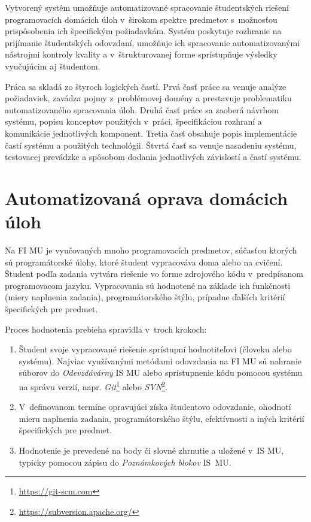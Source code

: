 \documentclass[
  digital, %
  oneside, %
  table,   %
  lof,     %
  lot,   %
]{fithesis3}
\begin{document}
Vytvorený systém umožňuje automatizované spracovanie študentských riešení programovacích domácich úloh v~širokom spektre predmetov s~možnosťou prispôsobenia ich špecifickým požiadavkám. Systém poskytuje rozhranie na prijímanie študentských odovzdaní, umožňuje ich spracovanie automatizovanými nástrojmi kontroly kvality a v~štrukturovanej forme sprístupňuje výsledky vyučujúcim aj študentom.

Práca sa skladá zo štyroch logických častí. Prvá časť práce sa venuje analýze požiadaviek, zavádza pojmy z~problémovej domény a prestavuje problematiku automatizovaného spracovania úloh. Druhá časť práce sa zaoberá návrhom systému, popisu konceptov použitých v~práci, špecifikáciou rozhraní a komunikácie jednotlivých komponent. Tretia časť obsahuje popis implementácie častí systému a použitých technológii. Štvrtá časť sa venuje nasadeniu systému, testovacej prevádzke a spôsobom dodania jednotlivých závislostí a častí systému. 


\chapter{Automatizovaná oprava domácich úloh}

Na FI MU je vyučovaných mnoho programovacích predmetov, súčasťou ktorých sú programátorské úlohy, ktoré študent vypracováva doma alebo na cvičení. Študent podľa zadania vytvára riešenie vo forme zdrojového kódu v~predpísanom programovacom jazyku. Vypracovania sú hodnotené na základe ich funkčnosti (miery naplnenia zadania), programátorského štýlu, prípadne ďalších kritérií špecifických pre predmet. 

Proces hodnotenia prebieha spravidla v~troch krokoch:
\begin{enumerate}
    \item Študent svoje vypracované riešenie sprístupní hodnotiteľovi (človeku alebo systému). Najviac využívanými metódami odovzdania na FI MU sú nahranie súborov do \textit{Odevzdávárny} IS MU alebo sprístupnenie kódu pomocou systému na správu verzií, napr. \textit{Git}\footnote{\url{https://git-scm.com}} alebo \textit{SVN}\footnote{\url{https://subversion.apache.org/}}. 
    \item V~definovanom termíne opravujúci získa študentovo odovzdanie, ohodnotí mieru naplnenia zadania, programátorského štýlu, efektívnosti a iných kritérií špecifických pre predmet. 
    \item Hodnotenie je prevedené na body či slovné zhrnutie a uložené v~IS MU, typicky pomocou zápisu do \emph{Poznámkových blokov} IS~MU.
\end{enumerate}
\end{document}
